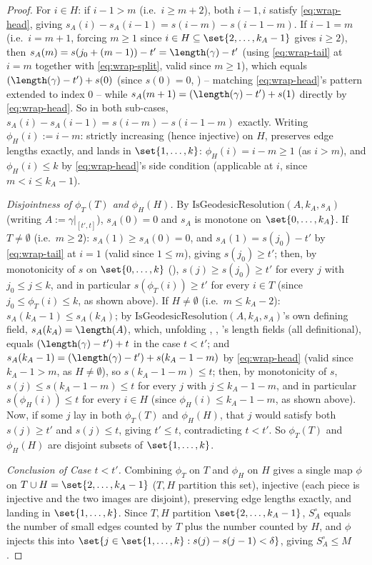 \begin{proof}
  For $i\in H$: if $i-1>m$ (i.e.\ $i\ge m+2$), both $i-1,i$ satisfy \eqref{eq:wrap-head}, giving
  $s_A(i)-s_A(i-1) = s(i-m)-s(i-1-m)$. If $i-1=m$ (i.e.\ $i=m+1$, forcing $m\ge1$ since $i\in H
  \subseteq \set{2,\dots,k_A-1}$ gives $i\ge2$), then $s_A(m) = s(j_0+(m-1))-t' =
  \length(\gamma)-t'$ (using \eqref{eq:wrap-tail} at $i=m$ together with \eqref{eq:wrap-split},
  valid since $m\ge1$), which equals $(\length(\gamma)-t')+s(0)$ (since $s(0)=0$,
  ) -- matching \eqref{eq:wrap-head}'s pattern extended to index $0$
  -- while $s_A(m+1)=(\length(\gamma)-t')+s(1)$ directly by \eqref{eq:wrap-head}. So in both
  sub-cases, $s_A(i)-s_A(i-1) = s(i-m)-s(i-1-m)$ exactly. Writing $\phi_H(i):=i-m$: strictly
  increasing (hence injective) on $H$, preserves edge lengths exactly, and lands in
  $\set{1,\dots,k}$: $\phi_H(i)=i-m\ge1$ (as $i>m$), and $\phi_H(i)\le k$ by \eqref{eq:wrap-head}'s
  side condition (applicable at $i$, since $m<i\le k_A-1$).

  \emph{Disjointness of $\phi_T(T)$ and $\phi_H(H)$.} By $\mathrm{IsGeodesicResolution}(A,k_A,s_A)$
  (writing $A:=\gamma|_{[t',t]}$), $s_A(0)=0$ and $s_A$ is monotone on $\set{0,\dots,k_A}$. If
  $T\ne\emptyset$ (i.e.\ $m\ge2$): $s_A(1)\ge s_A(0)=0$, and $s_A(1)=s(j_0)-t'$ by
  \eqref{eq:wrap-tail} at $i=1$ (valid since $1\le m$), giving $s(j_0)\ge t'$; then, by
  monotonicity of $s$ on $\set{0,\dots,k}$ (), $s(j)\ge s(j_0)\ge t'$
  for every $j$ with $j_0\le j\le k$, and in particular $s(\phi_T(i))\ge t'$ for every $i\in T$
  (since $j_0\le\phi_T(i)\le k$, as shown above). If $H\ne\emptyset$ (i.e.\ $m\le k_A-2$):
  $s_A(k_A-1)\le s_A(k_A)$; by $\mathrm{IsGeodesicResolution}(A,k_A,s_A)$'s own defining field,
  $s_A(k_A)=\length(A)$, which, unfolding , ,
  's length fields (all definitional), equals $(\length(\gamma)-t')+t$ in the
  case $t<t'$; and $s_A(k_A-1)=(\length(\gamma)-t')+s(k_A-1-m)$ by \eqref{eq:wrap-head} (valid since
  $k_A-1>m$, as $H\ne\emptyset$), so $s(k_A-1-m)\le t$; then, by monotonicity of $s$, $s(j)\le
  s(k_A-1-m)\le t$ for every $j$ with $j\le k_A-1-m$, and in particular $s(\phi_H(i))\le t$ for
  every $i\in H$ (since $\phi_H(i)\le k_A-1-m$, as shown above). Now, if some $j$ lay in both
  $\phi_T(T)$ and $\phi_H(H)$, that $j$ would satisfy both $s(j)\ge t'$ and $s(j)\le t$, giving
  $t'\le t$, contradicting $t<t'$. So $\phi_T(T)$ and $\phi_H(H)$ are disjoint subsets of
  $\set{1,\dots,k}$.

  \emph{Conclusion of Case $t<t'$.} Combining $\phi_T$ on $T$ and $\phi_H$ on $H$ gives a single
  map $\phi$ on $T\cup H = \set{2,\dots,k_A-1}$ ($T,H$ partition this set), injective (each piece
  is injective and the two images are disjoint), preserving edge lengths exactly, and landing in
  $\set{1,\dots,k}$. Since $T,H$ partition $\set{2,\dots,k_A-1}$, $S_A^{\circ}$ equals the number
  of small edges counted by $T$ plus the number counted by $H$, and $\phi$ injects this into
  $\set{j\in\set{1,\dots,k} : s(j)-s(j-1)<\delta}$, giving $S_A^{\circ}\le M$.


\end{proof}
